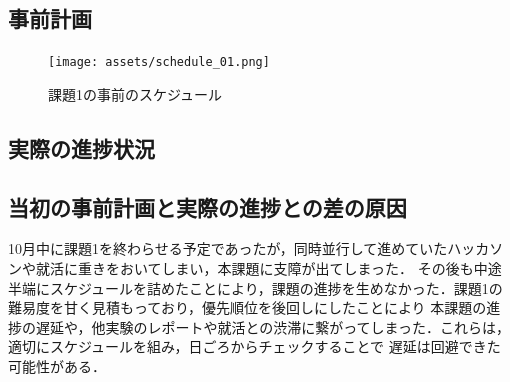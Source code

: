 \documentclass{jlreq}
\begin{document}
\subsection{事前計画}
\begin{figure}[H]
  \centering
  \texttt{[image: assets/schedule\_01.png]}
  \caption{課題1の事前のスケジュール}
  \label{fig:schedule01_pre}
\end{figure}

\subsection{実際の進捗状況}
\begin{table}[H]
  \centering
  \caption{課題1の実際の進捗}
\end{table}

\subsection{当初の事前計画と実際の進捗との差の原因}
10月中に課題1を終わらせる予定であったが，同時並行して進めていたハッカソンや就活に重きをおいてしまい，本課題に支障が出てしまった．
その後も中途半端にスケジュールを詰めたことにより，課題の進捗を生めなかった．課題1の難易度を甘く見積もっており，優先順位を後回しにしたことにより
本課題の進捗の遅延や，他実験のレポートや就活との渋滞に繋がってしまった．これらは，適切にスケジュールを組み，日ごろからチェックすることで
遅延は回避できた可能性がある．
\end{document}
